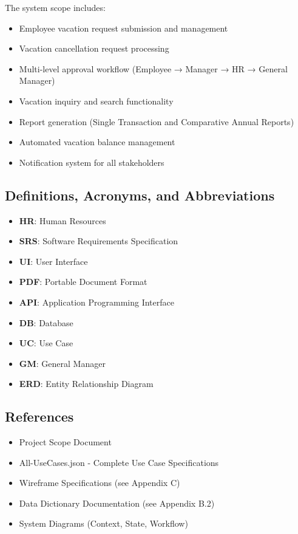 \documentclass[12pt,a4paper]{article}
\begin{document}
The system scope includes:
\begin{itemize}
    \item Employee vacation request submission and management
    \item Vacation cancellation request processing
    \item Multi-level approval workflow (Employee → Manager → HR → General Manager)
    \item Vacation inquiry and search functionality
    \item Report generation (Single Transaction and Comparative Annual Reports)
    \item Automated vacation balance management
    \item Notification system for all stakeholders
\end{itemize}

\subsection{Definitions, Acronyms, and Abbreviations}
\begin{itemize}
    \item \textbf{HR}: Human Resources
    \item \textbf{SRS}: Software Requirements Specification
    \item \textbf{UI}: User Interface
    \item \textbf{PDF}: Portable Document Format
    \item \textbf{API}: Application Programming Interface
    \item \textbf{DB}: Database
    \item \textbf{UC}: Use Case
    \item \textbf{GM}: General Manager
    \item \textbf{ERD}: Entity Relationship Diagram
\end{itemize}

\subsection{References}
\begin{itemize}
    \item Project Scope Document
    \item All-UseCases.json - Complete Use Case Specifications
    \item Wireframe Specifications (see Appendix C)
    \item Data Dictionary Documentation (see Appendix B.2)
    \item System Diagrams (Context, State, Workflow)
\end{itemize}
\end{document}
